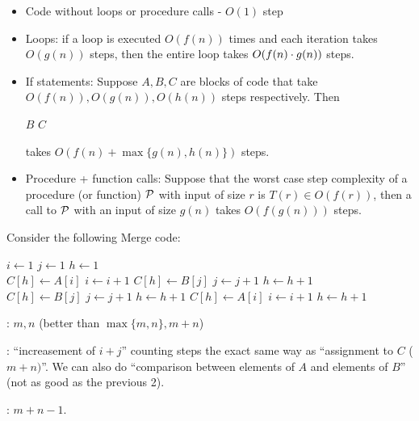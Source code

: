 \documentclass[11pt, cyan, night, 0.5in]{hw}
\begin{document}
\begin{itemize}
    \item Code without loops or procedure calls - $O(1)$ step
    \item Loops: if a loop is executed $O(f(n))$ times and each iteration takes $O(g(n))$ steps, then the entire loop takes $O(f(n)\cd g(n))$ steps.
    \item If statements: Suppose $A,B,C$ are blocks of code that take $O(f(n)), O(g(n)), O(h(n))$ steps respectively. Then 

    \begin{algorithm}
        \begin{algorithmic}
                \as $B$
            \aelse
                \as $C$
            \aeif
        \end{algorithmic}
    \end{algorithm}

    takes $O(f(n) + \max\{g(n),h(n)\})$ steps.
    \item Procedure + function calls: Suppose that the worst case step complexity of a procedure (or function) $\cal{P}$ with input of size $r$ is $T(r)\in O(f(r))$, then a call to $\cal{P}$ with an input of size $g(n)$ takes $O(f(g(n)))$ steps.
\end{itemize}


\begin{algorithm}
Consider the following Merge code:

    \begin{algorithmic}

        \as $i\gets 1$
        \as $j\gets 1$
        \as $h\gets 1$\\
    
                \as $C[h]\gets A[i]$
                \as $i\gets i+1$
            \aelse
                \as $C[h]\gets B[j]$
                \as $j\gets j+1$
            \aeif
            \as $h\gets h+1$
        \aewh\\
    
                \as $C[h]\gets B[j]$
                \as $j\gets j+1$
                \as $h\gets h+1$
            \aewh
        \aelse 
                \as $C[h]\gets A[i]$
                \as $i\gets i+1$
                \as $h\gets h+1$
            \aewh
        \aeif
        \aefunc
    \end{algorithmic}

    : $m,n$ (better than $\max\{m,n\}, m+n$)

    : ``increasement of $i+j$'' counting steps the exact same way as ``assignment to $C$ ($m+n)$''. We can also do ``comparison between elements of $A$ and elements of $B$'' (not as good as the previous 2).

    : $m+n-1$.
\end{algorithm}
\end{document}
